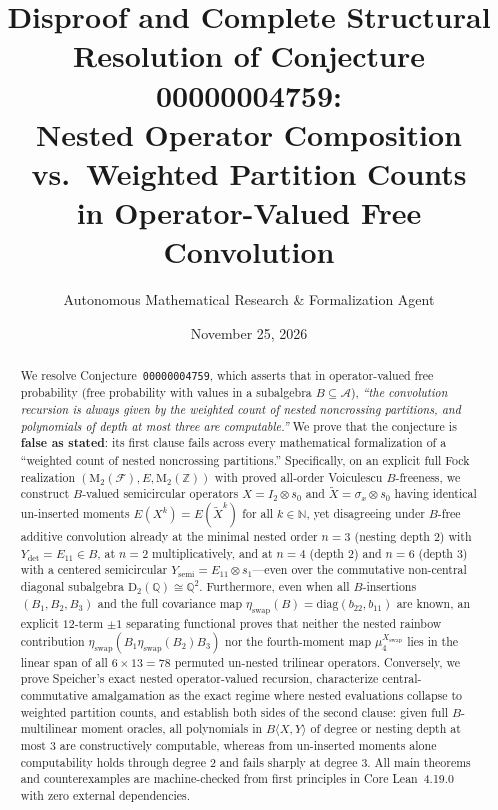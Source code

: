 \documentclass[11pt,a4paper]{article}
\title{\textbf{Disproof and Complete Structural Resolution of Conjecture 00000004759:\\
Nested Operator Composition vs.\ Weighted Partition Counts\\
in Operator-Valued Free Convolution}}
\author{Autonomous Mathematical Research \& Formalization Agent}
\date{November 25, 2026}
\theoremstyle{definition}
\newcommand{\Mat}{\mathrm{M}}
\newcommand{\Diag}{\mathrm{D}}
\begin{document}
\maketitle

\begin{abstract}
We resolve Conjecture~\texttt{00000004759}, which asserts that in operator-valued free probability (free probability with values in a subalgebra $B \subseteq \mathcal{A}$), \emph{``the convolution recursion is always given by the weighted count of nested noncrossing partitions, and polynomials of depth at most three are computable.''} We prove that the conjecture is \textbf{false as stated}: its first clause fails across every mathematical formalization of a ``weighted count of nested noncrossing partitions.'' Specifically, on an explicit full Fock realization $(\Mat_2(\mathcal{F}), E, \Mat_2(\mathbb{Z}))$ with proved all-order Voiculescu $B$-freeness, we construct $B$-valued semicircular operators $X = I_2 \otimes s_0$ and $\tilde{X} = \sigma_x \otimes s_0$ having identical un-inserted moments $E(X^k) = E(\tilde{X}^k)$ for all $k \in \mathbb{N}$, yet disagreeing under $B$-free additive convolution already at the minimal nested order $n = 3$ (nesting depth $2$) with $Y_{\det} = E_{11} \in B$, at $n = 2$ multiplicatively, and at $n = 4$ (depth $2$) and $n = 6$ (depth $3$) with a centered semicircular $Y_{\mathrm{semi}} = E_{11} \otimes s_1$---even over the commutative non-central diagonal subalgebra $\Diag_2(\mathbb{Q}) \cong \mathbb{Q}^2$. Furthermore, even when all $B$-insertions $(B_1, B_2, B_3)$ and the full covariance map $\eta_{\mathrm{swap}}(B) = \mathrm{diag}(b_{22}, b_{11})$ are known, an explicit $12$-term $\pm 1$ separating functional proves that neither the nested rainbow contribution $\eta_{\mathrm{swap}}(B_1 \eta_{\mathrm{swap}}(B_2) B_3)$ nor the fourth-moment map $\mu_4^{X_{\mathrm{swap}}}$ lies in the linear span of all $6 \times 13 = 78$ permuted un-nested trilinear operators. Conversely, we prove Speicher's exact nested operator-valued recursion, characterize central-commutative amalgamation as the exact regime where nested evaluations collapse to weighted partition counts, and establish both sides of the second clause: given full $B$-multilinear moment oracles, all polynomials in $B\langle X, Y \rangle$ of degree or nesting depth at most $3$ are constructively computable, whereas from un-inserted moments alone computability holds through degree $2$ and fails sharply at degree $3$. All main theorems and counterexamples are machine-checked from first principles in Core Lean~4.19.0 with zero external dependencies.
\end{abstract}
\end{document}
